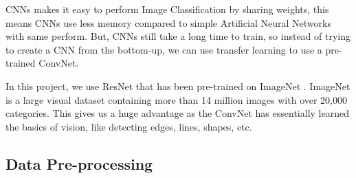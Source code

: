 \documentclass[../Report.tex]{subfiles}
\begin{document}
CNNs makes it easy to perform Image Classification by sharing weights, this means CNNs use less memory compared to simple Artificial Neural 
Networks with same perform. But, CNNs still take a long time to train, so instead of trying to create a CNN from the bottom-up, we can use 
transfer learning to use a pre-trained ConvNet.\par

In this project, we use ResNet that has been pre-trained on ImageNet \cite{imagenet}. ImageNet is a large visual dataset containing more than 
14 million images with over 20,000 categories. This gives us a huge advantage as the ConvNet has essentially learned the basics of vision, 
like detecting edges, lines, shapes, etc.\par

\subsection{Data Pre-processing}
\end{document}
